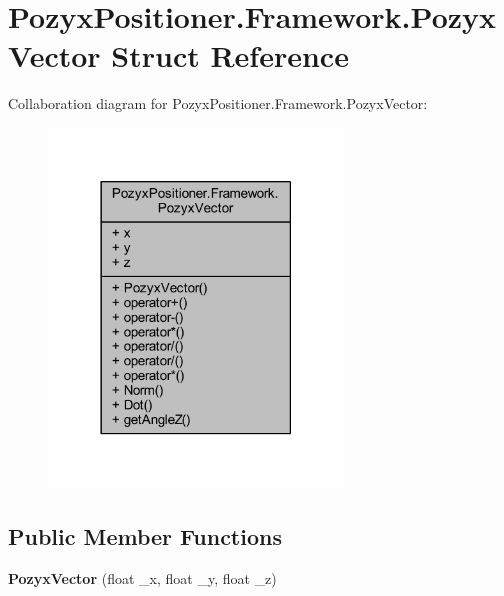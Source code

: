 \hypertarget{struct_pozyx_positioner_1_1_framework_1_1_pozyx_vector}{}\section{Pozyx\+Positioner.\+Framework.\+Pozyx\+Vector Struct Reference}
\label{struct_pozyx_positioner_1_1_framework_1_1_pozyx_vector}


Collaboration diagram for Pozyx\+Positioner.\+Framework.\+Pozyx\+Vector\+:\nopagebreak
\begin{figure}[H]
\begin{center}
\leavevmode
\includegraphics[width=222pt]{struct_pozyx_positioner_1_1_framework_1_1_pozyx_vector__coll__graph}
\end{center}
\end{figure}
\subsection*{Public Member Functions}
\begin{DoxyCompactItemize}
\item 
\mbox{\label{struct_pozyx_positioner_1_1_framework_1_1_pozyx_vector_aefc563d4720d301eaf6bd2cb62858c01}} 
{\bfseries Pozyx\+Vector} (float \+\_\+x, float \+\_\+y, float \+\_\+z)
\end{DoxyCompactItemize}
